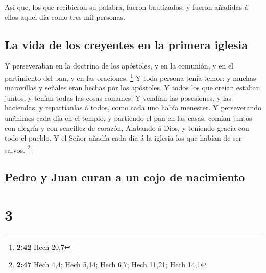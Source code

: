  Así que, los que recibieron su palabra, fueron
bautizados: y fueron añadidas á ellos aquel día como tres mil personas.

\hypertarget{la-vida-de-los-creyentes-en-la-primera-iglesia}{%
\subsection{La vida de los creyentes en la primera
iglesia}\label{la-vida-de-los-creyentes-en-la-primera-iglesia}}

 Y perseveraban en la doctrina de los apóstoles, y en la
comunión, y en el partimiento del pan, y en las oraciones. \footnote{\textbf{2:42}
  Hech 20,7}  Y toda persona tenía temor: y muchas
maravillas y señales eran hechas por los apóstoles.  Y
todos los que creían estaban juntos; y tenían todas las cosas comunes;
 Y vendían las posesiones, y las haciendas, y
repartíanlas á todos, como cada uno había menester.  Y
perseverando unánimes cada día en el templo, y partiendo el pan en las
casas, comían juntos con alegría y con sencillez de corazón,
 Alabando á Dios, y teniendo gracia con todo el pueblo. Y
el Señor añadía cada día á la iglesia los que habían de ser salvos.
\footnote{\textbf{2:47} Hech 4,4; Hech 5,14; Hech 6,7; Hech 11,21; Hech
  14,1}

\hypertarget{pedro-y-juan-curan-a-un-cojo-de-nacimiento}{%
\subsection{Pedro y Juan curan a un cojo de
nacimiento}\label{pedro-y-juan-curan-a-un-cojo-de-nacimiento}}

\hypertarget{section-2}{%
\section{3}\label{section-2}}

